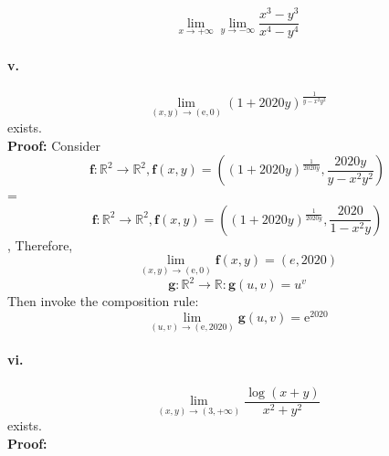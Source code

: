 \documentclass[11pt, a4paper]{article}
\begin{document}
$$\lim_{x \to +\infty}\lim_{y \to -\infty} \frac{x ^ 3 - y ^ 3}{x ^ 4 - y ^ 4}$$


\paragraph{v.}
$$\lim_{(x, y) \to (\mathrm{e}, 0)}(1 + 2020y)^{\frac{1}{y - x ^ 2 y ^ 2}}$$ exists. \\
\textbf{Proof:} Consider 
$$\bm{f}: \mathbb{R} ^ 2 \to \mathbb{R} ^ 2, \bm{f}(x, y) = ((1 + 2020y) ^ \frac{1}{2020y}, \frac{2020y}{y - x ^ 2 y ^ 2})$$ = 
$$\bm{f}: \mathbb{R} ^ 2 \to \mathbb{R} ^ 2, \bm{f}(x, y) = ((1 + 2020y) ^ \frac{1}{2020y}, \frac{2020}{1 - x ^ 2 y})$$,
Therefore, 
$$\lim_{(x, y) \to (\mathrm{e}, 0)} \bm{f}(x, y) = (e, 2020)$$
$$\bm{g}: \mathbb{R} ^ 2 \to \mathbb{R}: \bm{g}(u, v) = u ^ v$$
Then invoke the composition rule:
$$\lim_{(u, v) \to (\mathrm{e}, 2020)} \bm{g}(u, v) = \mathrm{e} ^ {2020}$$

\paragraph{vi.}
$$\lim_{(x, y) \to (3, +\infty)} \frac{\log(x + y)}{x ^ 2 + y ^ 2}$$ exists. \\
\textbf{Proof:} 
\end{document}
